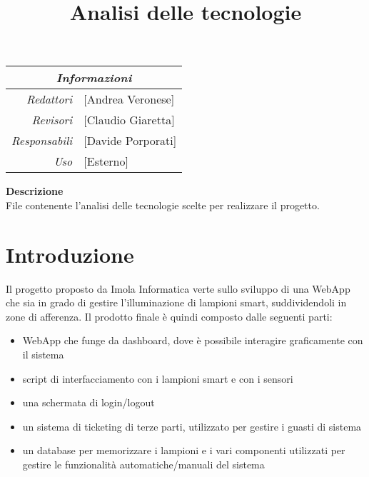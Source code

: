 \documentclass[12pt]{article}
\begin{document}
\graphicspath{ {../templates/img/} }
\setcounter{tocdepth}{4}
\setcounter{secnumdepth}{4}
\title{Analisi delle tecnologie}

\firstPage

\pagestyle{genericDocstyle}
\maketitle

\begin{center}
    \begin{tabular}{r | l}
		\multicolumn{2}{c}{\textit{Informazioni}}\\
		\hline
		
			\textit{Redattori} &
			[Andrea Veronese]\makecell{}\\

			\textit{Revisori} &
			[Claudio Giaretta]\makecell{}\\
			\textit{Responsabili} &
			[Davide Porporati]\makecell{}\\
		      \textit{Uso} & 
                [Esterno]\makecell{}\\
    \end{tabular}
\end{center}

\begin{center}
    \textbf{Descrizione}\\
	File contenente l'analisi delle tecnologie scelte per realizzare il progetto. 
\end{center}

\pagebreak

\tableofcontents
\pagebreak

\printindex 



\makeversioni

\section{Introduzione}
Il progetto proposto da Imola Informatica verte sullo sviluppo di una WebApp che sia in grado di gestire l'illuminazione di lampioni smart, suddividendoli in zone di afferenza.
Il prodotto finale è quindi composto dalle seguenti parti:
\begin{itemize}
	\item WebApp che funge da dashboard, dove è possibile interagire graficamente con il sistema
	\item script di interfacciamento con i lampioni smart e con i sensori
	\item una schermata di login/logout
	\item un sistema di ticketing di terze parti, utilizzato per gestire i guasti di sistema
	\item un database per memorizzare i lampioni e i vari componenti utilizzati per gestire le funzionalità automatiche/manuali del sistema
\end{itemize}
\end{document}
